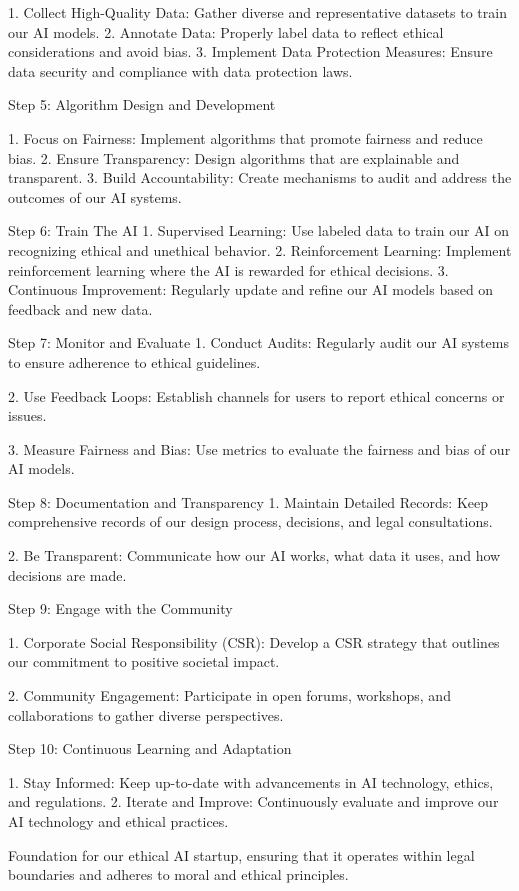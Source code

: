 \documentclass[12pt,letterpaper]{article}
\begin{document}
1. Collect High-Quality Data: Gather diverse and representative datasets to train our AI models.
2. Annotate Data: Properly label data to reflect ethical considerations and avoid bias.
3. Implement Data Protection Measures: Ensure data security and compliance with data protection laws.

 Step 5: Algorithm Design and Development

1. Focus on Fairness: Implement algorithms that promote fairness and reduce bias.
2. Ensure Transparency: Design algorithms that are explainable and transparent.
3. Build Accountability: Create mechanisms to audit and address the outcomes of our AI systems.

 Step 6: Train The AI
1. Supervised Learning: Use labeled data to train our AI on recognizing ethical and unethical behavior.
2. Reinforcement Learning: Implement reinforcement learning where the AI is rewarded for ethical decisions.
3. Continuous Improvement: Regularly update and refine our AI models based on feedback and new data.

 Step 7: Monitor and Evaluate
1. Conduct Audits: Regularly audit our AI systems to ensure adherence to ethical guidelines.

2. Use Feedback Loops: Establish channels for users to report ethical concerns or issues.

3. Measure Fairness and Bias: Use metrics to evaluate the fairness and bias of our AI models.

 Step 8: Documentation and Transparency
1. Maintain Detailed Records: Keep comprehensive records of our design process, decisions, and legal consultations.

2. Be Transparent: Communicate how our AI works, what data it uses, and how decisions are made.

 Step 9: Engage with the Community

1. Corporate Social Responsibility (CSR): Develop a CSR strategy that outlines our commitment to positive societal impact.

2. Community Engagement: Participate in open forums, workshops, and collaborations to gather diverse perspectives.

 Step 10: Continuous Learning and Adaptation

1. Stay Informed: Keep up-to-date with advancements in AI technology, ethics, and regulations.
2. Iterate and Improve: Continuously evaluate and improve our AI technology and ethical practices.

Foundation for our ethical AI startup, 
ensuring that it operates within legal boundaries and adheres to moral and ethical principles.
\end{document}
